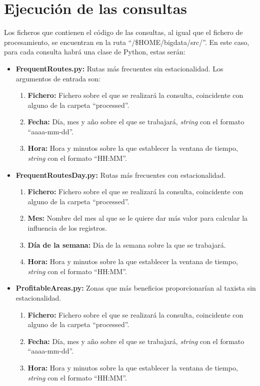 \section{Ejecución de las consultas}
Los ficheros que contienen el código de las consultas, al igual que el fichero de procesamiento, se encuentran en la ruta ``/\$HOME/bigdata/src/''. En este caso, para cada consulta habrá una clase de Python, estas serán:

\begin{itemize}
\item \textbf{FrequentRoutes.py:} Rutas más frecuentes sin estacionalidad. Los argumentos de entrada son:
\begin{enumerate}
\item \textbf{Fichero:} Fichero sobre el que se realizará la consulta, coincidente con alguno de la carpeta ``processed''.
\item \textbf{Fecha:} Día, mes y año sobre el que se trabajará, \textit{string} con el formato ``aaaa-mm-dd''.
\item \textbf{Hora:} Hora y minutos sobre la que establecer la ventana de tiempo, \textit{string} con el formato ``HH:MM''.
\end{enumerate}

\clearpage
\item \textbf{FrequentRoutesDay.py:} Rutas más frecuentes con estacionalidad.
\begin{enumerate}
\item \textbf{Fichero:} Fichero sobre el que se realizará la consulta, coincidente con alguno de la carpeta ``processed''.
\item \textbf{Mes:} Nombre del mes al que se le quiere dar más valor para calcular la influencia de los registros.
\item \textbf{Día de la semana:} Día de la semana sobre la que se trabajará.
\item \textbf{Hora:} Hora y minutos sobre la que establecer la ventana de tiempo, \textit{string} con el formato ``HH:MM''.
\end{enumerate}

\item \textbf{ProfitableAreas.py:} Zonas que más beneficios proporcionarían al taxista sin estacionalidad.
\begin{enumerate}
\item \textbf{Fichero:} Fichero sobre el que se realizará la consulta, coincidente con alguno de la carpeta ``processed''.
\item \textbf{Fecha:} Día, mes y año sobre el que se trabajará, \textit{string} con el formato ``aaaa-mm-dd''.
\item \textbf{Hora:} Hora y minutos sobre la que establecer la ventana de tiempo, \textit{string} con el formato ``HH:MM''.
\end{enumerate}


\end{itemize}
